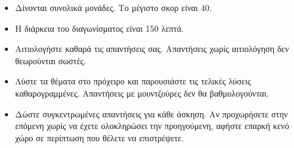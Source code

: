 \documentclass[10pt,greek,solution]{exam-uoc}
\begin{document}
\begin{information}
    \begin{itemize}
        \item Δίνονται συνολικά \gettotalpoints{} μονάδες. Το μέγιστο σκορ είναι 40.
        \item Η διάρκεια του διαγωνίσματος είναι 150 λεπτά.
        \item Αιτιολογήστε καθαρά τις απαντήσεις σας. Απαντήσεις χωρίς αιτιολόγηση
              δεν θεωρούνται σωστές.
        \item Λύστε τα θέματα στο πρόχειρο και παρουσιάστε τις τελικές λύσεις 
              καθαρογραμμένες. Απαντήσεις με μουντζούρες δεν θα βαθμολογούνται.
        \item Δώστε συγκεντρωμένες απαντήσεις για κάθε άσκηση. 
              Αν προχωρήσετε στην επόμενη χωρίς να έχετε ολοκληρώσει την προηγούμενη, 
              αφήστε επαρκή κενό χώρο σε περίπτωση που θέλετε να επιστρέψετε.
    \end{itemize}
\end{information}
\end{document}
